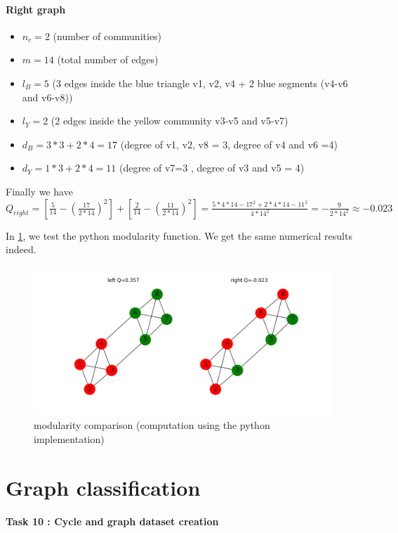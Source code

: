 \documentclass[a4paper]{article}
\begin{document}
\subsection*{Right graph}
\begin{itemize}
    \item $n_c = 2$ (number of communities)
    \item $m = 14$ (total number of edges)
    \item $l_B = 5$ (3 edges inside the blue triangle v1, v2, v4 + 2 blue segments (v4-v6 and v6-v8))
    \item $l_Y  = 2$ (2 edges inside the yellow community v3-v5 and v5-v7)
    \item $d_B = 3*3 + 2*4 = 17$ (degree of v1, v2, v8 = 3, degree of v4 and v6 =4)
    \item $d_Y = 1*3 + 2*4 = 11$ (degree of v7=3 , degree of v3 and v5 = 4)
\end{itemize}


Finally we have $Q_{right} = \left[\frac{5}{14} - (\frac{17}{2*14})^2 \right] + \left[\frac{2}{14} - (\frac{11}{2*14})^2 \right] 
= \frac{5*4*14-17^2 + 2*4*14-11^2}{4*14^2} =-\frac{9}{2*14^2}\approx -0.023$

In \ref{fig:modularity_computation}, we test the python modularity function.
We get the same numerical results indeed.

\begin{figure}[ht]
    \centering
    \includegraphics[width=.8\textwidth]{figures/modularity_computation.png}
    \caption{modularity comparison (computation using the python implementation)}
    \label{fig:modularity_computation}
\end{figure}

\pagebreak
\part[short]{Graph classification}

\subsection*{Task 10 : Cycle and graph dataset creation}
\end{document}

